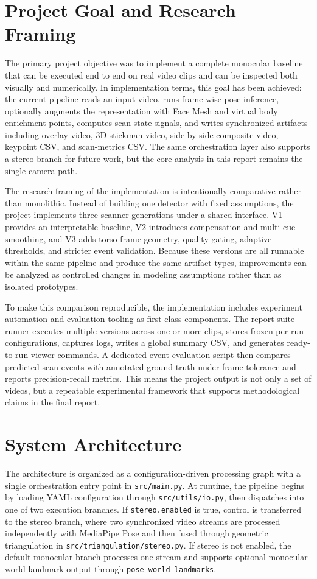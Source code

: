 \documentclass[11pt,a4paper]{article}
\begin{document}
\section{Project Goal and Research Framing}
The primary project objective was to implement a complete monocular baseline that can be executed end to end on real video clips and can be inspected both visually and numerically. In implementation terms, this goal has been achieved: the current pipeline reads an input video, runs frame-wise pose inference, optionally augments the representation with Face Mesh and virtual body enrichment points, computes scan-state signals, and writes synchronized artifacts including overlay video, 3D stickman video, side-by-side composite video, keypoint CSV, and scan-metrics CSV. The same orchestration layer also supports a stereo branch for future work, but the core analysis in this report remains the single-camera path.

The research framing of the implementation is intentionally comparative rather than monolithic. Instead of building one detector with fixed assumptions, the project implements three scanner generations under a shared interface. V1 provides an interpretable baseline, V2 introduces compensation and multi-cue smoothing, and V3 adds torso-frame geometry, quality gating, adaptive thresholds, and stricter event validation. Because these versions are all runnable within the same pipeline and produce the same artifact types, improvements can be analyzed as controlled changes in modeling assumptions rather than as isolated prototypes.

To make this comparison reproducible, the implementation includes experiment automation and evaluation tooling as first-class components. The report-suite runner executes multiple versions across one or more clips, stores frozen per-run configurations, captures logs, writes a global summary CSV, and generates ready-to-run viewer commands. A dedicated event-evaluation script then compares predicted scan events with annotated ground truth under frame tolerance and reports precision-recall metrics. This means the project output is not only a set of videos, but a repeatable experimental framework that supports methodological claims in the final report.

\section{System Architecture}
The architecture is organized as a configuration-driven processing graph with a single orchestration entry point in \texttt{src/main.py}. At runtime, the pipeline begins by loading YAML configuration through \texttt{src/utils/io.py}, then dispatches into one of two execution branches. If \texttt{stereo.enabled} is true, control is transferred to the stereo branch, where two synchronized video streams are processed independently with MediaPipe Pose and then fused through geometric triangulation in \texttt{src/triangulation/stereo.py}. If stereo is not enabled, the default monocular branch processes one stream and supports optional monocular world-landmark output through \texttt{pose\_world\_landmarks}.
\end{document}
